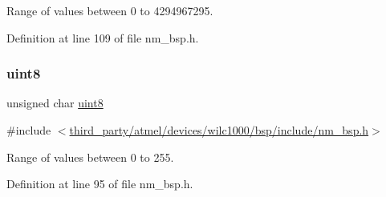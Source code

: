 Range of values between 0 to 4294967295. 



Definition at line 109 of file nm\+\_\+bsp.\+h.

\mbox{\label{group__DataT_ga4df709a77647e870bbf1d955b8edc9a6}} 
\subsubsection{\texorpdfstring{uint8}{uint8}}
{\footnotesize\ttfamily unsigned char \hyperlink{group__DataT_ga4df709a77647e870bbf1d955b8edc9a6}{uint8}}



{\ttfamily \#include $<$\hyperlink{nm__bsp_8h}{third\+\_\+party/atmel/devices/wilc1000/bsp/include/nm\+\_\+bsp.\+h}$>$}



Range of values between 0 to 255. 



Definition at line 95 of file nm\+\_\+bsp.\+h.

